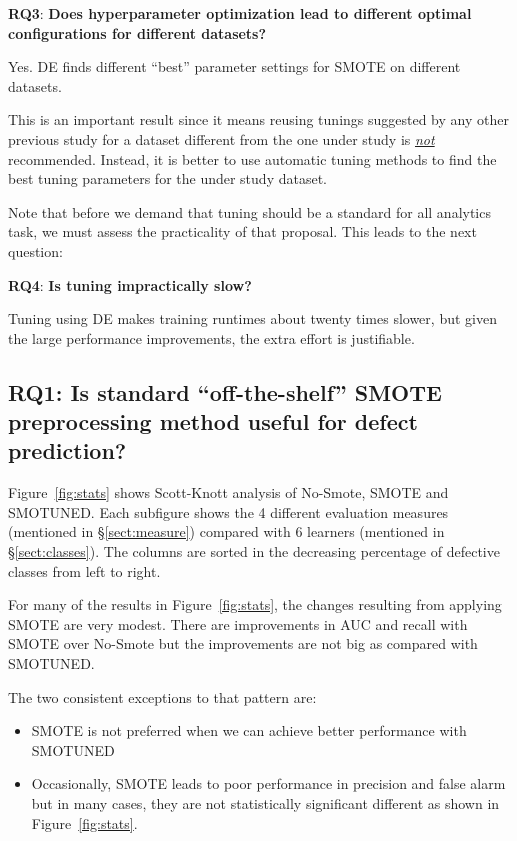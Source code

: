 \documentclass[10pt,conference]{IEEEtran}
\newcommand{\bi}{\begin{itemize}[leftmargin=0.4cm]}
\newcommand{\ei}{\end{itemize}}
\theoremstyle{break}
\theoremstyle{break}
\newcommand{\tion}[1]{{\S}\ref{sect:#1}}
\newcommand{\sma}{{\sc SMOTE}}
\begin{document}
 \textbf{RQ3}: \textbf{Does hyperparameter optimization lead to different optimal configurations for different datasets?} 
 
 \begin{lesson}Yes. DE finds different ``best'' parameter settings for {\sma} on different datasets.
 \end{lesson}
  This is an important result
  since it means
  reusing tunings suggested  by  any other  previous study  for a dataset different from the one under study is \underline{{\em not}} recommended. Instead,  it is better to
      use automatic tuning  methods  to find the best tuning parameters for the 
      under study dataset.
      
       Note that
 before we demand that tuning should be a
 standard for all analytics task,
 we must assess the practicality of that
 proposal. This leads to the next question:
 
   \textbf{RQ4}: \textbf{Is tuning 
   impractically
   slow?} 
 
 \begin{lesson}Tuning using DE makes training runtimes about twenty times slower, but given
 the large performance improvements,
 the extra effort is justifiable. \end{lesson}
 
 



\subsection{\textbf{RQ1: Is standard ``off-the-shelf'' SMOTE preprocessing method useful for defect prediction?}}

Figure~\ref{fig:stats} shows Scott-Knott analysis of No-Smote, SMOTE and SMOTUNED. Each subfigure shows the 4 different evaluation measures (mentioned in \tion{measure}) compared with 6 learners (mentioned in \tion{classes}). The columns are sorted in the decreasing percentage of defective classes from left to right.

For many of the results in Figure~\ref{fig:stats}, the changes
resulting from applying SMOTE are very modest. There are improvements in AUC and recall with SMOTE over No-Smote but the improvements are not big as compared with SMOTUNED.

The two consistent exceptions to that pattern are:
\bi
\item 
SMOTE is not preferred when we can achieve better performance with SMOTUNED
\item 
Occasionally, SMOTE leads to poor performance in precision and false alarm but in many cases, they are not statistically significant different as shown in Figure~\ref{fig:stats}.  
\ei
\end{document}
